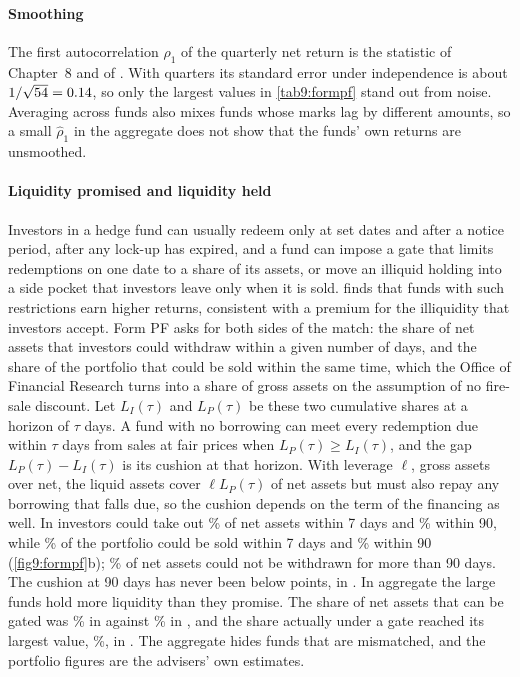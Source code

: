 \begin{chapterrefs}
\paragraph{Smoothing}
The first autocorrelation $\hat\rho_1$ of the quarterly net return is the statistic of Chapter~8 and
of \textcite{getmansky2004}. With \hdNEquity{} quarters its standard error under independence is about
$1/\sqrt{54}=0.14$, so only the largest values in \cref{tab9:formpf} stand out from
noise. Averaging across funds also mixes funds whose marks lag by different amounts, so a small $\hat\rho_1$
in the aggregate does not show that the funds' own returns are unsmoothed.

\paragraph{Liquidity promised and liquidity held}
Investors in a hedge fund can usually redeem only at set dates and after a notice period, after any
lock-up has expired, and a fund can impose a gate that limits redemptions on one date to a share of its
assets, or move an illiquid holding into a side pocket that investors leave only when it is sold.
\textcite{aragon2007} finds that funds with such restrictions earn higher returns, consistent with a
premium for the illiquidity that investors accept. Form PF asks for both sides of the match: the share
of net assets that investors could withdraw within a given number of days, and the share of the
portfolio that could be sold within the same time, which the Office of Financial Research turns into a
share of gross assets on the assumption of no fire-sale discount. Let $L_I(\tau)$ and $L_P(\tau)$ be these two
cumulative shares at a horizon of $\tau$ days. A fund with no borrowing can meet every redemption due
within $\tau$ days from sales at fair prices when $L_P(\tau)\ge L_I(\tau)$, and the gap $L_P(\tau)-L_I(\tau)$ is its
cushion at that horizon. With leverage $\ell$, gross assets over net, the liquid assets cover
$\ell L_P(\tau)$ of net assets but must also repay any borrowing that falls due, so the cushion depends
on the term of the financing as well. In \hdLast{} investors could take out \hdInvSeven\% of net assets
within 7 days and \hdInvNinety\% within 90, while \hdPorSeven\% of the portfolio could be sold within 7
days and \hdPorNinety\% within 90 (\cref{fig9:formpf}b); \hdInvLong\% of net assets could not be
withdrawn for more than 90 days. The cushion at 90 days has never been below \hdCushionMin{} points, in
\hdCushionMinQ. In aggregate the large funds hold more liquidity than they promise. The share of net
assets that can be gated was \hdCanGate\% in \hdLast{} against \hdCanGateFirst\% in \hdFirst, and the
share actually under a gate reached its largest value, \hdGatedMax\%, in \hdGatedMaxQ. The aggregate
hides funds that are mismatched, and the portfolio figures are the advisers' own estimates.


\end{chapterrefs}
